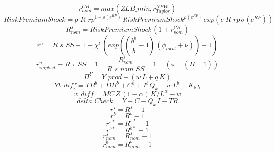 \begin{dmath}
{ r^{CB}_{nom}}=max({ZLB\_min},{ r_{Taylor}^{NEW} })
\end{dmath}
\begin{dmath}
{ Risk Premium Shock }={p\_R\_rp}^{1-{\rho(e^{RP}) }}\, { Risk Premium Shock }^{{\rho(e^{RP}) }}\, exp\left({e\_R\_rp}\, {\sigma(e^{RP}) }\right)
\end{dmath}
\begin{dmath}
{ R^s_{nom}}={ Risk Premium Shock }\, \left(1+{ r^{CB}_{nom}}\right)
\end{dmath}
\begin{dmath}
{ r^n }={R\_s\_SS}-1-{\chi^b }\, \left(exp\left(\left(\frac{{b^b}}{{ \bar{b} }}-1\right)\, \left({\phi_{local}}+{\nu }\right)\right)-1\right)
\end{dmath}
\begin{dmath}
{r^n_{implied}}={R\_s\_SS}-1+\frac{{ R^s_{nom}}}{{R\_s\_nom\_SS}}-1-\left({ \pi }-\left({ \bar{\Pi} }-1\right)\right)
\end{dmath}
\begin{dmath}
{\Pi^Y}={Y\_prod}-\left({w}\, {L}+{q}\, {K}\right)
\end{dmath}
\begin{dmath}
{Yb\_diff}={TB^b}+{DB^b}+{C^b}+{I^b}\, { Q_k }-{w}\, {L^b}-{K_b}\, {q}
\end{dmath}
\begin{dmath}
{w\_diff}={MC}\, {Z}\, \left(1-{\alpha }\right)\, {K/L}^{{\alpha }}-{w}
\end{dmath}
\begin{dmath}
{delta\_Check}={Y}-{C}-{ Q_k }\, {I}-{TB}
\end{dmath}
\begin{dmath}
{r^s}={R^s}-1
\end{dmath}
\begin{dmath}
{r^b}={R^b}-1
\end{dmath}
\begin{dmath}
{r^{s*}}={R^{s*}}-1
\end{dmath}
\begin{dmath}
{r^{b*}}={R^{b*}}-1
\end{dmath}
\begin{dmath}
{ r^s_{nom}}={ R^s_{nom}}-1
\end{dmath}
\begin{dmath}
{ r^b_{nom}}={ R^b_{nom}}-1
\end{dmath}
